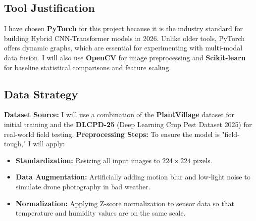 \documentclass[12pt,a4paper]{article}
\begin{document}
\subsection{Tool Justification}
I have chosen \textbf{PyTorch} for this project because it is the industry standard for building Hybrid CNN-Transformer models in 2026. Unlike older tools, PyTorch offers dynamic graphs, which are essential for experimenting with multi-modal data fusion. I will also use \textbf{OpenCV} for image preprocessing and \textbf{Scikit-learn} for baseline statistical comparisons and feature scaling.

\subsection{Data Strategy}
\textbf{Dataset Source:} I will use a combination of the \textbf{PlantVillage} dataset for initial training and the \textbf{DLCPD-25} (Deep Learning Crop Pest Dataset 2025) for real-world field testing.
\textbf{Preprocessing Steps:} To ensure the model is "field-tough," I will apply:
\begin{itemize}
    \item \textbf{Standardization:} Resizing all input images to $224 \times 224$ pixels.
    \item \textbf{Data Augmentation:} Artificially adding motion blur and low-light noise to simulate drone photography in bad weather.
    \item \textbf{Normalization:} Applying Z-score normalization to sensor data so that temperature and humidity values are on the same scale.
\end{itemize}
\end{document}

